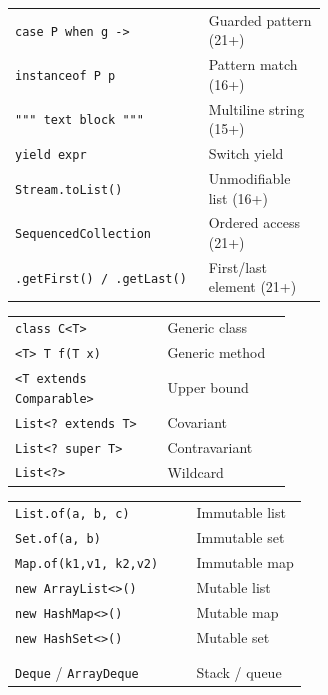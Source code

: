 \documentclass[10pt]{extarticle}
\begin{document}
\begin{multicols}{2}
\begin{tabularx}{\linewidth}{@{}>{\raggedright\arraybackslash}p{0.62\linewidth}@{\enspace}Y@{}}
\texttt{case P when g ->}            & Guarded pattern (21+) \\
\texttt{instanceof P p}              & Pattern match (16+) \\
\texttt{""" text block """}          & Multiline string (15+) \\
\texttt{yield expr}                  & Switch yield \\
\texttt{Stream.toList()}             & Unmodifiable list (16+) \\
\texttt{SequencedCollection}         & Ordered access (21+) \\
\texttt{.getFirst() / .getLast()}    & First/last element (21+) \\
\end{tabularx}

\begin{tabularx}{\linewidth}{@{}>{\raggedright\arraybackslash}p{0.55\linewidth}@{\enspace}Y@{}}
\texttt{class C<T>}                  & Generic class \\
\texttt{<T> T f(T x)}               & Generic method \\
\texttt{<T extends Comparable>}     & Upper bound \\
\texttt{List<? extends T>}          & Covariant \\
\texttt{List<? super T>}            & Contravariant \\
\texttt{List<?>}                     & Wildcard \\
\end{tabularx}

\begin{tabularx}{\linewidth}{@{}>{\raggedright\arraybackslash}p{0.62\linewidth}@{\enspace}Y@{}}
\texttt{List.of(a, b, c)}           & Immutable list \\
\texttt{Set.of(a, b)}               & Immutable set \\
\texttt{Map.of(k1,v1, k2,v2)}      & Immutable map \\
\texttt{new ArrayList<>()}           & Mutable list \\
\texttt{new HashMap<>()}             & Mutable map \\
\texttt{new HashSet<>()}             & Mutable set \\
 & \\
 \\
\texttt{Deque} / \texttt{ArrayDeque} & Stack / queue \\
\end{tabularx}


\end{multicols}
\end{document}

